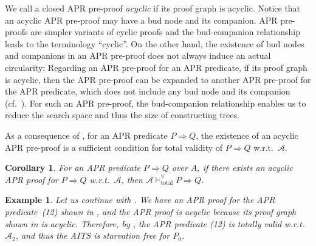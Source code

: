 \documentclass[10pt,a4paper]{article}
\newtheorem{corollary}[theorem]{Corollary}
\newtheorem{example}[theorem]{Example}
\def\cA{\mathcal{A}}
\newcommand{\ReachPred}[2]{#1 \Rightarrow #2}
\newcommand{\Valid}[3]{#2 \mathrel{\mathrel{\models^\forall_{\mathrm{#1}}}} #3}
\newcommand{\TotallyValid}[2][\cA]{\Valid{total}{#1}{#2}}
\def\cApet{\cA_2}
\begin{document}
We call a closed APR pre-proof \emph{acyclic} if its proof graph is acyclic.
Notice that an acyclic APR pre-proof may have a bud node and its companion.
APR pre-proofs are simpler variants of cyclic proofs and the bud-companion relationship leads to the terminology ``cyclic''.
On the other hand, the existence of bud nodes and companions in an APR pre-proof does not always induce an actual circularity:
Regarding an APR pre-proof for an APR predicate, if its proof graph is acyclic, then the APR pre-proof can be expanded to another APR pre-proof for the APR predicate, which does not include any bud node and its companion (cf.~\cite[Section~5]{Bro05}).
For such an APR pre-proof, the bud-companion relationship enables us to reduce the search space and thus the size of constructing trees.

As a consequence of , for an APR predicate $\ReachPred{P}{Q}$, the existence of an acyclic APR pre-proof is a sufficient condition for total validity of $\ReachPred{P}{Q}$ w.r.t.\ $\cA$.
\begin{corollary}
	\label{cor:sufficient-condition-for-total-validity}
	For an APR predicate $\ReachPred{P}{Q}$ over $A$,
	if there exists an acyclic APR proof for $\ReachPred{P}{Q}$ w.r.t.\ $\cA$,
	then $\TotallyValid{\ReachPred{P}{Q}}$.
\end{corollary}

\begin{example}
	\label{ex:total-validity}
	Let us continue with .
	We have an APR proof for the APR predicate~(12) shown in , and the APR proof is acyclic because its proof graph shown in  is acyclic.
	Therefore, by , the APR predicate (12) is totally valid w.r.t.\ $\cApet$, and thus the AITS is starvation free for $P_0$.
\end{example}
\end{document}
